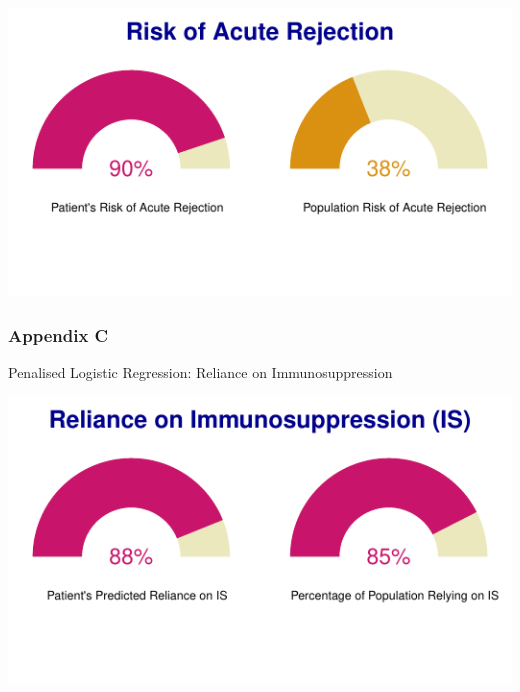 \documentclass[a4paper,9pt,twocolumn,twoside,]{pinp}
\begin{document}
\begin{center}\includegraphics{Executive_Report_files/figure-latex/AR-1} \end{center}

\hypertarget{appendix-c}{%
\subsubsection{Appendix C}\label{appendix-c}}

Penalised Logistic Regression: Reliance on Immunosuppression

\begin{center}\includegraphics{Executive_Report_files/figure-latex/immuno-1} \end{center}





\end{document}
